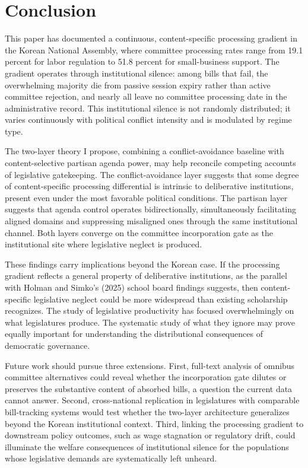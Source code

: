 \documentclass[11pt]{article}
\begin{document}
\section{Conclusion}
\label{sec:conclusion}

This paper has documented a continuous, content-specific processing gradient in the Korean National Assembly, where committee processing rates range from 19.1 percent for labor regulation to 51.8 percent for small-business support. The gradient operates through institutional silence: among bills that fail, the overwhelming majority die from passive session expiry rather than active committee rejection, and nearly all leave no committee processing date in the administrative record. This institutional silence is not randomly distributed; it varies continuously with political conflict intensity and is modulated by regime type.

The two-layer theory I propose, combining a conflict-avoidance baseline with content-selective partisan agenda power, may help reconcile competing accounts of legislative gatekeeping. The conflict-avoidance layer suggests that some degree of content-specific processing differential is intrinsic to deliberative institutions, present even under the most favorable political conditions. The partisan layer suggests that agenda control operates bidirectionally, simultaneously facilitating aligned domains and suppressing misaligned ones through the same institutional channel. Both layers converge on the committee incorporation gate as the institutional site where legislative neglect is produced.

These findings carry implications beyond the Korean case. If the processing gradient reflects a general property of deliberative institutions, as the parallel with Holman and Simko's (2025) school board findings suggests, then content-specific legislative neglect could be more widespread than existing scholarship recognizes. The study of legislative productivity has focused overwhelmingly on what legislatures produce. The systematic study of what they ignore may prove equally important for understanding the distributional consequences of democratic governance.

Future work should pursue three extensions. First, full-text analysis of omnibus committee alternatives could reveal whether the incorporation gate dilutes or preserves the substantive content of absorbed bills, a question the current data cannot answer. Second, cross-national replication in legislatures with comparable bill-tracking systems would test whether the two-layer architecture generalizes beyond the Korean institutional context. Third, linking the processing gradient to downstream policy outcomes, such as wage stagnation or regulatory drift, could illuminate the welfare consequences of institutional silence for the populations whose legislative demands are systematically left unheard.
\end{document}

